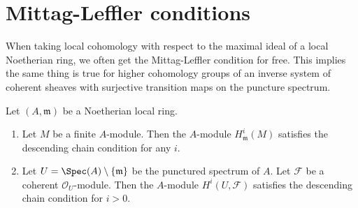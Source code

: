 \section{Mittag-Leffler conditions}
\label{section-ML}

\noindent
When taking local cohomology with respect to the maximal ideal
of a local Noetherian ring, we often get the Mittag-Leffler condition
for free. This implies the same thing is true for higher cohomology
groups of an inverse system of coherent sheaves with surjective transition
maps on the puncture spectrum.

\begin{lemma}
\label{lemma-descending-chain}
Let $(A, \mathfrak m)$ be a Noetherian local ring.
\begin{enumerate}
\item Let $M$ be a finite $A$-module. Then the $A$-module
$H^i_\mathfrak m(M)$ satisfies the descending chain condition
for any $i$.
\item Let $U = \Spec(A) \setminus \{\mathfrak m\}$ be the
punctured spectrum of $A$.
Let $\mathcal{F}$ be a coherent $\mathcal{O}_U$-module.
Then the $A$-module $H^i(U, \mathcal{F})$
satisfies the descending chain condition for $i > 0$.
\end{enumerate}
\end{lemma}

